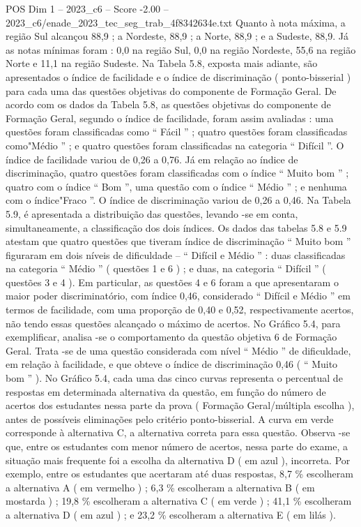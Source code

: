 \begin{textsample}{POS Dim 1 – 2023\_c6 – Score -2.00 – 2023\_c6/enade\_2023\_tec\_seg\_trab\_4f8342634e.txt}
Quanto à nota máxima, a região Sul alcançou 88,9 ; a Nordeste, 88,9 ; a Norte, 88,9 ; e a Sudeste, 88,9.
Já as notas mínimas foram : 0,0 na região Sul, 0,0 na região Nordeste, 55,6 na região Norte e 11,1 na região Sudeste.
Na Tabela 5.8, exposta mais adiante, são apresentados o índice de facilidade e o índice de discriminação ( ponto-bisserial ) para cada uma das questões objetivas do componente de Formação Geral.
De acordo com os dados da Tabela 5.8, as questões objetivas do componente de Formação Geral, segundo o índice de facilidade, foram assim avaliadas : uma questões foram classificadas como “ Fácil ” ; quatro questões foram classificadas como"Médio ” ; e quatro questões foram classificadas na categoria “ Difícil ”.
O índice de facilidade variou de 0,26 a 0,76.
Já em relação ao índice de discriminação, quatro questões foram classificadas com o índice “ Muito bom ” ; quatro com o índice “ Bom ”, uma questão com o índice “ Médio ” ; e nenhuma com o índice"Fraco ”.
O índice de discriminação variou de 0,26 a 0,46.
Na Tabela 5.9, é apresentada a distribuição das questões, levando -se em conta, simultaneamente, a classificação dos dois índices.
Os dados das tabelas 5.8 e 5.9 atestam que quatro questões que tiveram índice de discriminação “ Muito bom ” figuraram em dois níveis de dificuldade – “ Difícil e Médio ” : duas classificadas na categoria “ Médio ” ( questões 1 e 6 ) ; e duas, na categoria “ Difícil ” ( questões 3 e 4 ).
Em particular, as questões 4 e 6 foram a que apresentaram o maior poder discriminatório, com índice 0,46, considerado “ Difícil e Médio ” em termos de facilidade, com uma proporção de 0,40 e 0,52, respectivamente acertos, não tendo essas questões alcançado o máximo de acertos.
No Gráfico 5.4, para exemplificar, analisa -se o comportamento da questão objetiva 6 de Formação Geral.
Trata -se de uma questão considerada com nível “ Médio ” de dificuldade, em relação à facilidade, e que obteve o índice de discriminação 0,46 ( “ Muito bom ” ).
No Gráfico 5.4, cada uma das cinco curvas representa o percentual de respostas em determinada alternativa da questão, em função do número de acertos dos estudantes nessa parte da prova ( Formação Geral/múltipla escolha ), antes de possíveis eliminações pelo critério ponto-bisserial.
A curva em verde corresponde à alternativa C, a alternativa correta para essa questão.
Observa -se que, entre os estudantes com menor número de acertos, nessa parte do exame, a situação mais frequente foi a escolha da alternativa D ( em azul ), incorreta.
Por exemplo, entre os estudantes que acertaram até duas respostas, 8,7 \% escolheram a alternativa A ( em vermelho ) ; 6,3 \% escolheram a alternativa B ( em mostarda ) ; 19,8 \% escolheram a alternativa C ( em verde ) ; 41,1 \% escolheram a alternativa D ( em azul ) ; e 23,2 \% escolheram a alternativa E ( em lilás ).

\end{textsample}
